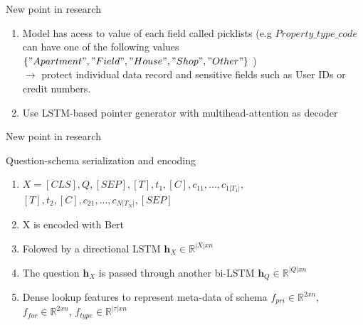 \documentclass{beamer}
\begin{document}
\begin{frame}[t]{New point in research}\vspace{10pt}
\begin{enumerate}
\item  Model has acess to value of each field called picklists (e.g $Property\_type\_code$ can have one of the following values $\{"Apartment","Field","House","Shop","Other"\}$ ) \\
$\rightarrow$ protect individual data record and sensitive fields such as User IDs or credit numbers.
\item Use LSTM-based pointer generator with multihead-attention as decoder
\end{enumerate}
\end{frame} 
\begin{frame}[t]{New point in research}\vspace{10pt}
\begin{block}{Question-schema serialization and encoding}
\vspace{0.5em}
\begin{enumerate}
\item $X = [CLS],Q,[SEP],[T],t_{1},[C],c_{11},...,c_{1|T_1|},$\\$[T],t_{2},[C],c_{21},...,c_{N|T_N|},[SEP]$ \\
\item X is encoded with Bert
\item Folowed by a directional LSTM $\textbf{h}_{X}\in\mathbb{R}^{|X|xn}$ 
\item The question $\textbf{h}_{X}$ is passed through another bi-LSTM $\textbf{h}_{Q}\in\mathbb{R}^{|Q|xn}$ 
\item Dense lookup features to represent meta-data of schema $f_{pri}\in\mathbb{R}^{2xn}$, $f_{for}\in\mathbb{R}^{2xn}$, $f_{type}\in\mathbb{R}^{|\tau|xn}$
\vspace{0.5em}
\end{enumerate}
\end{block}
\end{frame}
\end{document}
